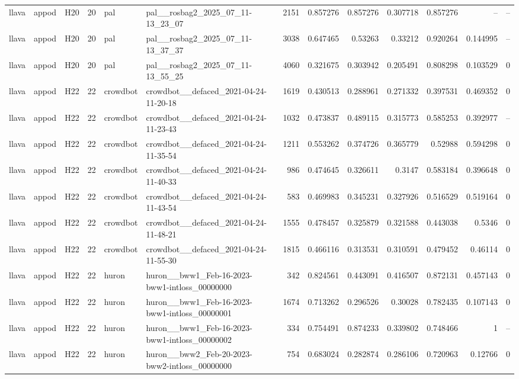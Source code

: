 \begin{longtable}{lllrllrrrrrrr}
llava & appod & H20 & 20 & pal & pal\_\_rosbag2\_2025\_07\_11-13\_23\_07 & 2151 & 0.857276 & 0.857276 & 0.307718 & 0.857276 & -- & -- \\
llava & appod & H20 & 20 & pal & pal\_\_rosbag2\_2025\_07\_11-13\_37\_37 & 3038 & 0.647465 & 0.53263 & 0.33212 & 0.920264 & 0.144995 & -- \\
llava & appod & H20 & 20 & pal & pal\_\_rosbag2\_2025\_07\_11-13\_55\_25 & 4060 & 0.321675 & 0.303942 & 0.205491 & 0.808298 & 0.103529 & 0 \\
llava & appod & H22 & 22 & crowdbot & crowdbot\_\_defaced\_2021-04-24-11-20-18 & 1619 & 0.430513 & 0.288961 & 0.271332 & 0.397531 & 0.469352 & 0 \\
llava & appod & H22 & 22 & crowdbot & crowdbot\_\_defaced\_2021-04-24-11-23-43 & 1032 & 0.473837 & 0.489115 & 0.315773 & 0.585253 & 0.392977 & -- \\
llava & appod & H22 & 22 & crowdbot & crowdbot\_\_defaced\_2021-04-24-11-35-54 & 1211 & 0.553262 & 0.374726 & 0.365779 & 0.52988 & 0.594298 & 0 \\
llava & appod & H22 & 22 & crowdbot & crowdbot\_\_defaced\_2021-04-24-11-40-33 & 986 & 0.474645 & 0.326611 & 0.3147 & 0.583184 & 0.396648 & 0 \\
llava & appod & H22 & 22 & crowdbot & crowdbot\_\_defaced\_2021-04-24-11-43-54 & 583 & 0.469983 & 0.345231 & 0.327926 & 0.516529 & 0.519164 & 0 \\
llava & appod & H22 & 22 & crowdbot & crowdbot\_\_defaced\_2021-04-24-11-48-21 & 1555 & 0.478457 & 0.325879 & 0.321588 & 0.443038 & 0.5346 & 0 \\
llava & appod & H22 & 22 & crowdbot & crowdbot\_\_defaced\_2021-04-24-11-55-30 & 1815 & 0.466116 & 0.313531 & 0.310591 & 0.479452 & 0.46114 & 0 \\
llava & appod & H22 & 22 & huron & huron\_\_bww1\_Feb-16-2023-bww1-intloss\_00000000 & 342 & 0.824561 & 0.443091 & 0.416507 & 0.872131 & 0.457143 & 0 \\
llava & appod & H22 & 22 & huron & huron\_\_bww1\_Feb-16-2023-bww1-intloss\_00000001 & 1674 & 0.713262 & 0.296526 & 0.30028 & 0.782435 & 0.107143 & 0 \\
llava & appod & H22 & 22 & huron & huron\_\_bww1\_Feb-16-2023-bww1-intloss\_00000002 & 334 & 0.754491 & 0.874233 & 0.339802 & 0.748466 & 1 & -- \\
llava & appod & H22 & 22 & huron & huron\_\_bww2\_Feb-20-2023-bww2-intloss\_00000000 & 754 & 0.683024 & 0.282874 & 0.286106 & 0.720963 & 0.12766 & 0 \\

\end{longtable}
